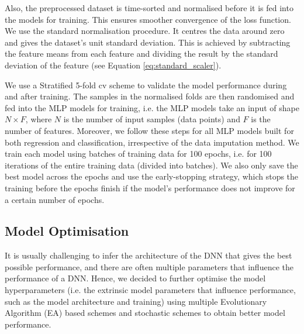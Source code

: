 Also, the preprocessed dataset is time-sorted and normalised before it is fed into the models for training. This ensures smoother convergence of the loss function. We use the standard normalisation procedure. It centres the data around zero and gives the dataset's unit standard deviation. This is achieved by subtracting the feature means from each feature and dividing the result by the standard deviation of the feature (see Equation \ref{eq:standard_scaler}).


We use a Stratified 5-fold \gls{cv} scheme to validate the model performance during and after training. The samples in the normalised folds are then randomised and fed into the MLP models for training, i.e. the MLP models take an input of shape $N \times F$, where $N$ is the number of input samples (data points) and $F$ is the number of features. Moreover, we follow these steps for all MLP models built for both regression and classification, irrespective of the data imputation method. We train each model using batches of training data for 100 epochs, i.e. for 100 iterations of the entire training data (divided into batches). We also only save the best model across the epochs and use the early-stopping strategy, which stops the training before the epochs finish if the model's performance does not improve for a certain number of epochs. 




\subsection{Model Optimisation}
\label{sec:model_optimisation}
It is usually challenging to infer the architecture of the DNN that gives the best possible performance, and there are often multiple parameters that influence the performance of a DNN. Hence, we decided to further optimise the model hyperparameters (i.e. the extrinsic model parameters that influence performance, such as the model architecture and training) using multiple Evolutionary Algorithm (EA) based schemes and stochastic schemes to obtain better model performance. 



